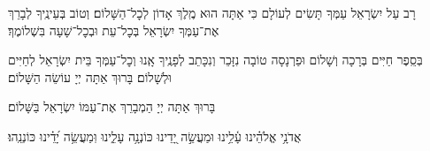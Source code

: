 \documentclass[twoside, openany, parskip=half, 11pt]{book}
\begin{document}
רָב עַל יִשְׂרָאֵל עַמְּךָ תָּשִׂים לְעוֹלָם כִּי אַתָּה הוּא מֶֽלֶךְ אָדוֹן לְכׇל־הַשָּׁלוֹם׃ וְטוֹב בְּעֵינֶֽיךָ לְבָרֵךְ אֶת־עַמְּךָ יִשְׂרָאֵל בְּכׇל־עֵת וּבְכׇל־שָׁעָה בִּשְׁלוֹמֶךָ׃
\vspace{-0.4\baselineskip}
\begin{paracol}{2}

\begin{small}
בְּסֵֽפֶר חַיִּים בְּרָכָה וְשָׁלוֹם וּפַרְנָסָה טוֹבָה נִזָּכֵר וְנִכָּתֵב לְפָנֶֽיךָ אָֽנוּ וְכׇל־עַמְּךָ בֵּית יִשְׂרָאֵל לְחַיִּים וּלְשָׁלוֹם׃ בָּרוּךְ אַתָּה יְיָ עוֹשֵׂה הַשָּׁלוֹם׃

\end{small}
\switchcolumn
בָּרוּךְ אַתָּה יְיָ הַמְבָרֵךְ אֶת־עַמּוֹ יִשְׂרָאֵל בַּשָּׁלוֹם׃

\end{paracol}



\tachanunim

\vspace{\baselineskip}

\begin{sometimes}


\halfkaddish


\label{vihi noam}

אֲדֹנָ֥י אֱלֹהֵ֗ינוּ עָ֫לֵ֥ינוּ וּמַעֲשֵׂ֣ה יָ֭דֵינוּ כּוֹנְנָ֥ה עָלֵ֑ינוּ וּֽמַעֲשֵׂ֥ה יָ֝דֵ֗ינוּ כּוֹנְנֵֽהוּ׃\\

\label{v ata kadosh}
\kedushadesidra

\end{sometimes}

\fullkaddish

\vfill

\\
\\

\aleinu

\ledavid

\mournerskaddish

\vfill


 \\
\end{document}
